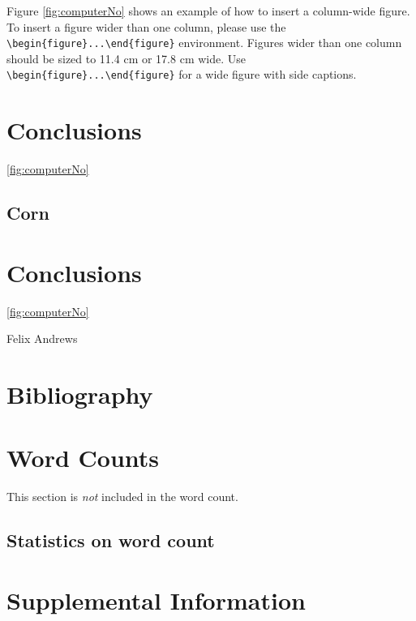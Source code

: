 \documentclass[times,twoside,watermark]{rilab}
\begin{document}
Figure \ref{fig:computerNo} shows an example of how to insert a column-wide figure. To insert a figure wider than one column, please use the \verb|\begin{figure}...\end{figure}| environment. Figures wider than one column should be sized to 11.4 cm or 17.8 cm wide. Use \verb|\begin{figure}...\end{figure}| for a wide figure with side captions.

\section*{Conclusions}

\lipsum[3-3]
 \ref{fig:computerNo}

\subsection*{Corn}
\lipsum[1-2]

\section*{Conclusions}
\lipsum[6-6]


 \ref{fig:computerNo}

\begin{acknowledgements}
Felix Andrews
\end{acknowledgements}

\section*{Bibliography}


\onecolumn
\newpage

\section*{Word Counts}
This section is \textit{not} included in the word count.

\subsection*{Statistics on word count}
\detailtexcount
\newpage

\captionsetup*{format=largeformat}
\section{Supplemental Information} \label{note:Note1}
\lipsum[3-3]
\end{document}

